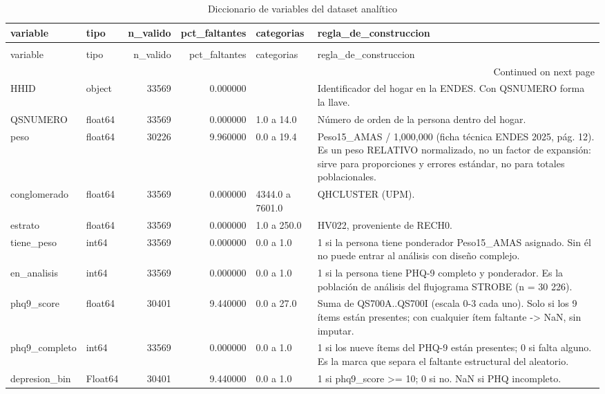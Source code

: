\begin{longtable}{llrrll}
\caption{Diccionario de variables del dataset analítico} \label{tab:tabla_00_diccionario} \\
\toprule
variable & tipo & n\_valido & pct\_faltantes & categorias & regla\_de\_construccion \\
\midrule
\endfirsthead
\caption[]{Diccionario de variables del dataset analítico} \\
\toprule
variable & tipo & n\_valido & pct\_faltantes & categorias & regla\_de\_construccion \\
\midrule
\endhead
\midrule
\multicolumn{6}{r}{Continued on next page} \\
\midrule
\endfoot
\bottomrule
\endlastfoot
HHID & object & 33569 & 0.000000 &  & Identificador del hogar en la ENDES. Con QSNUMERO forma la llave. \\
QSNUMERO & float64 & 33569 & 0.000000 & 1.0 a 14.0 & Número de orden de la persona dentro del hogar. \\
peso & float64 & 30226 & 9.960000 & 0.0 a 19.4 & Peso15\_AMAS / 1,000,000 (ficha técnica ENDES 2025, pág. 12). Es un peso RELATIVO normalizado, no un factor de expansión: sirve para proporciones y errores estándar, no para totales poblacionales. \\
conglomerado & float64 & 33569 & 0.000000 & 4344.0 a 7601.0 & QHCLUSTER (UPM). \\
estrato & float64 & 33569 & 0.000000 & 1.0 a 250.0 & HV022, proveniente de RECH0. \\
tiene\_peso & int64 & 33569 & 0.000000 & 0.0 a 1.0 & 1 si la persona tiene ponderador Peso15\_AMAS asignado. Sin él no puede entrar al análisis con diseño complejo. \\
en\_analisis & int64 & 33569 & 0.000000 & 0.0 a 1.0 & 1 si la persona tiene PHQ-9 completo y ponderador. Es la población de análisis del flujograma STROBE (n = 30 226). \\
phq9\_score & float64 & 30401 & 9.440000 & 0.0 a 27.0 & Suma de QS700A..QS700I (escala 0-3 cada uno). Solo si los 9 ítems están presentes; con cualquier ítem faltante -> NaN, sin imputar. \\
phq9\_completo & int64 & 33569 & 0.000000 & 0.0 a 1.0 & 1 si los nueve ítems del PHQ-9 están presentes; 0 si falta alguno. Es la marca que separa el faltante estructural del aleatorio. \\
depresion\_bin & Float64 & 30401 & 9.440000 & 0.0 a 1.0 & 1 si phq9\_score >= 10; 0 si no. NaN si PHQ incompleto. \\

\end{longtable}
